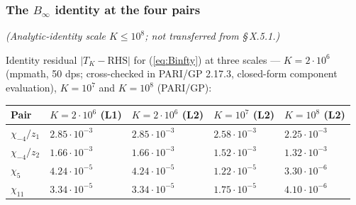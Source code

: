 \subsubsection{The \(B_\infty\) identity at the four pairs}

\emph{(Analytic-identity scale \(K \le 10^{8}\); not transferred from \S\,X.5.1.)}

Identity residual \(|T_K - \mathrm{RHS}|\) for (\ref{eq:Binfty}) at
three scales --- \(K = 2 \cdot 10^{6}\) (mpmath, 50 dps; cross-checked
in PARI/GP 2.17.3, closed-form component evaluation), \(K = 10^{7}\)
and \(K = 10^{8}\) (PARI/GP):

{\def\LTcaptype{none} %
\begin{longtable}[]{@{}
  >{\raggedright\arraybackslash}p{}
  >{\raggedleft\arraybackslash}p{}
  >{\raggedleft\arraybackslash}p{}
  >{\raggedleft\arraybackslash}p{}
  >{\raggedleft\arraybackslash}p{}@{}}
\toprule\noalign{}
\begin{minipage}[b]{\linewidth}\raggedright
Pair
\end{minipage} & \begin{minipage}[b]{\linewidth}\raggedleft
\(K = 2 \cdot 10^{6}\) (L1)
\end{minipage} & \begin{minipage}[b]{\linewidth}\raggedleft
\(K = 2 \cdot 10^{6}\) (L2)
\end{minipage} & \begin{minipage}[b]{\linewidth}\raggedleft
\(K = 10^{7}\) (L2)
\end{minipage} & \begin{minipage}[b]{\linewidth}\raggedleft
\(K = 10^{8}\) (L2)
\end{minipage} \\
\midrule\noalign{}
\endhead
\bottomrule\noalign{}
\endlastfoot
\(\chi_{-4}/z_1\) & \(2.85 \cdot 10^{-3}\) & \(2.85 \cdot 10^{-3}\) & \(2.58 \cdot 10^{-3}\) & \(2.25 \cdot 10^{-3}\) \\
\(\chi_{-4}/z_2\) & \(1.66 \cdot 10^{-3}\) & \(1.66 \cdot 10^{-3}\) & \(1.52 \cdot 10^{-3}\) & \(1.32 \cdot 10^{-3}\) \\
\(\chi_5\) & \(4.24 \cdot 10^{-5}\) & \(4.24 \cdot 10^{-5}\) & \(1.22 \cdot 10^{-5}\) & \(3.30 \cdot 10^{-6}\) \\
\(\chi_{11}\) & \(3.34 \cdot 10^{-5}\) & \(3.34 \cdot 10^{-5}\) & \(1.75 \cdot 10^{-5}\) & \(4.10 \cdot 10^{-6}\) \\
\end{longtable}
}

